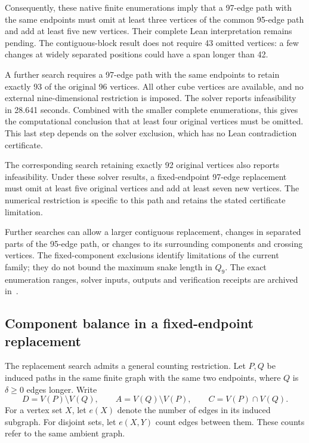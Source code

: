 \documentclass[11pt,a4paper]{article}
\theoremstyle{definition}
\theoremstyle{remark}
\begin{document}
Consequently, these native finite enumerations imply that a 97-edge
path with the same endpoints must omit at least three vertices of the
common 95-edge path and add at least five new vertices. Their complete
Lean interpretation remains pending. The contiguous-block result
does not require 43 omitted vertices: a few changes at widely separated
positions could have a span longer than 42.

A further search requires a 97-edge path with the same endpoints
to retain exactly 93 of the original 96 vertices. All other cube vertices
are available, and no external nine-dimensional restriction is imposed.
The solver reports infeasibility in 28.641 seconds. Combined with the
smaller complete enumerations, this gives the computational conclusion
that at least four original vertices must be omitted. This last step
depends on the solver exclusion, which has no Lean contradiction
certificate.

The corresponding search retaining exactly 92 original vertices
also reports infeasibility. Under these solver results, a fixed-endpoint
97-edge replacement must omit at least five original vertices and add
at least seven new vertices. The numerical restriction is specific to
this path and retains the stated certificate limitation.


Further searches can allow a larger contiguous replacement, changes
in separated parts of the 95-edge path, or changes to its surrounding
components and crossing vertices. The fixed-component
exclusions identify limitations of the current family; they do not
bound the maximum snake length in $Q_9$. The exact enumeration ranges,
solver inputs, outputs and verification receipts are archived
in~\cite{replacement189archive}.

\subsection{Component balance in a fixed-endpoint replacement}
\label{sec:exchange-balance}
The replacement search admits a general counting restriction. Let $P,Q$
be induced paths in the same finite graph with the same two endpoints,
where $Q$ is $\delta\ge0$ edges longer. Write
\[
D=V(P)\setminus V(Q),\qquad A=V(Q)\setminus V(P),
\qquad C=V(P)\cap V(Q).
\]
For a vertex set $X$, let $e(X)$ denote the number of edges in its
induced subgraph. For disjoint sets, let $e(X,Y)$ count edges between
them. These counts refer to the same ambient graph.
\end{document}
